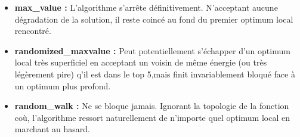 \documentclass[11pt,a4paper]{report}
\begin{document}
\begin{answers}[5cm]
\begin{itemize}
    \item \textbf{max\_value :} L'algorithme s'arrête définitivement. N'acceptant aucune dégradation de la solution, il reste coincé au fond du premier optimum local rencontré.
    \item \textbf{randomized\_maxvalue :} Peut potentiellement s'échapper d'un  optimum local très superficiel en acceptant un  voisin de même énergie (ou très légèrement pire) q'il est dans le top 5,mais finit invariablement bloqué face à un optimum plus profond.
    \item \textbf{random\_walk :} Ne se bloque jamais. Ignorant la topologie de la fonction coù, l'algorithme ressort naturellement de n'importe quel optimum local en marchant au hasard.
\end{itemize}
\end{answers}
\end{document}
